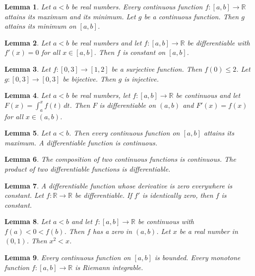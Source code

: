 \documentclass{article}
\newtheorem{lemma}{Lemma}
\begin{document}
\begin{lemma}\label{extreme-values}
Let $a<b$ be real numbers. Every continuous function $f\colon[a,b]\to\mathbb{R}$ attains its maximum and its minimum. Let $g$ be a continuous function. Then $g$ attains its minimum on $[a,b]$.
\end{lemma}

\begin{lemma}\label{constant-on}
Let $a<b$ be real numbers and let $f\colon[a,b]\to\mathbb{R}$ be differentiable with $f'(x)=0$ for all $x\in[a,b]$. Then $f$ is constant on $[a,b]$.
\end{lemma}

\begin{lemma}\label{onto}
Let $f\colon[0,3]\to[1,2]$ be a surjective function. Then $f(0)\le2$. Let $g\colon[0,3]\to[0,3]$ be bijective. Then $g$ is injective.
\end{lemma}

\begin{lemma}\label{fundamental-theorem}
Let $a<b$ be real numbers, let $f\colon[a,b]\to\mathbb{R}$ be continuous and let $F(x)=\int_a^x f(t)\,dt$. Then $F$ is differentiable on $(a,b)$ and $F'(x)=f(x)$ for all $x\in(a,b)$.
\end{lemma}

\begin{lemma}\label{attains-on}
Let $a<b$. Then every continuous function on $[a,b]$ attains its maximum. A differentiable function is continuous.
\end{lemma}

\begin{lemma}\label{two-functions}
The composition of two continuous functions is continuous. The product of two differentiable functions is differentiable.
\end{lemma}

\begin{lemma}\label{whose-derivative}
A differentiable function whose derivative is zero everywhere is constant. Let $f\colon\mathbb{R}\to\mathbb{R}$ be differentiable. If $f'$ is identically zero, then $f$ is constant.
\end{lemma}

\begin{lemma}\label{zero-in}
Let $a<b$ and let $f\colon[a,b]\to\mathbb{R}$ be continuous with $f(a)<0<f(b)$. Then $f$ has a zero in $(a,b)$. Let $x$ be a real number in $(0,1)$. Then $x^2<x$.
\end{lemma}

\begin{lemma}\label{every-on}
Every continuous function on $[a,b]$ is bounded. Every monotone function $f\colon[a,b]\to\mathbb{R}$ is Riemann integrable.
\end{lemma}
\end{document}
